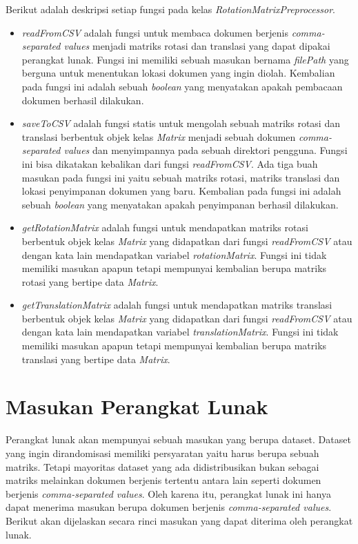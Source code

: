 Berikut adalah deskripsi setiap fungsi pada kelas \textit{RotationMatrixPreprocessor}.
\begin{itemize}
	\item \textit{readFromCSV} adalah fungsi untuk membaca dokumen berjenis \textit{comma-separated values} menjadi matriks rotasi dan translasi yang dapat dipakai perangkat lunak. Fungsi ini memiliki sebuah masukan bernama \textit{filePath} yang berguna untuk menentukan lokasi dokumen yang ingin diolah. Kembalian pada fungsi ini adalah sebuah \textit{boolean} yang menyatakan apakah pembacaan dokumen berhasil dilakukan.
	\item \textit{saveToCSV} adalah fungsi statis untuk mengolah sebuah matriks rotasi dan translasi berbentuk objek kelas \textit{Matrix} menjadi sebuah dokumen \textit{comma-separated values} dan menyimpannya pada sebuah direktori pengguna. Fungsi ini bisa dikatakan kebalikan dari fungsi \textit{readFromCSV}. Ada tiga buah masukan pada fungsi ini yaitu sebuah matriks rotasi, matriks translasi dan lokasi penyimpanan dokumen yang baru. Kembalian pada fungsi ini adalah sebuah \textit{boolean} yang menyatakan apakah penyimpanan berhasil dilakukan.
	\item \textit{getRotationMatrix} adalah fungsi untuk mendapatkan matriks rotasi berbentuk objek kelas \textit{Matrix} yang didapatkan dari fungsi \textit{readFromCSV} atau dengan kata lain mendapatkan variabel \textit{rotationMatrix}. Fungsi ini tidak memiliki masukan apapun tetapi mempunyai kembalian berupa matriks rotasi yang bertipe data \textit{Matrix}.
	\item \textit{getTranslationMatrix} adalah fungsi untuk mendapatkan matriks translasi berbentuk objek kelas \textit{Matrix} yang didapatkan dari fungsi \textit{readFromCSV} atau dengan kata lain mendapatkan variabel \textit{translationMatrix}. Fungsi ini tidak memiliki masukan apapun tetapi mempunyai kembalian berupa matriks translasi yang bertipe data \textit{Matrix}.
\end{itemize}

\section{Masukan Perangkat Lunak}
\label{sec:masukan-pl}

Perangkat lunak akan mempunyai sebuah masukan yang berupa dataset. Dataset yang ingin dirandomisasi memiliki persyaratan yaitu harus berupa sebuah matriks. Tetapi mayoritas dataset yang ada didistribusikan bukan sebagai matriks melainkan dokumen berjenis tertentu antara lain seperti dokumen berjenis \textit{comma-separated values}. Oleh karena itu, perangkat lunak ini hanya dapat menerima masukan berupa dokumen berjenis \textit{comma-separated values}. Berikut akan dijelaskan secara rinci masukan yang dapat diterima oleh perangkat lunak.


